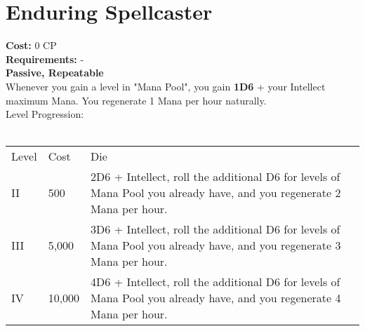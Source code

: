 \section{Enduring Spellcaster}\label{sec:enduringspellcaster}
\textbf{Cost:} 0 CP\\
\textbf{Requirements:} -\\
\textbf{Passive, Repeatable}\\
Whenever you gain a level in "Mana Pool", you gain \textbf{1D6} + your Intellect maximum Mana.
You regenerate 1 Mana per hour naturally.
\\
Level Progression:\\
\\
\begin{tabular}{l | l | p{12cm} }
	Level & Cost & Die\\
	II & 500 & 2D6 + Intellect, roll the additional D6 for levels of Mana Pool you already have, and you regenerate 2 Mana per hour. \\
	III & 5,000 & 3D6 + Intellect, roll the additional D6 for levels of Mana Pool you already have, and you regenerate 3 Mana per hour. \\
	IV & 10,000 & 4D6 + Intellect, roll the additional D6 for levels of Mana Pool you already have, and you regenerate 4 Mana per hour.\\
\end{tabular}